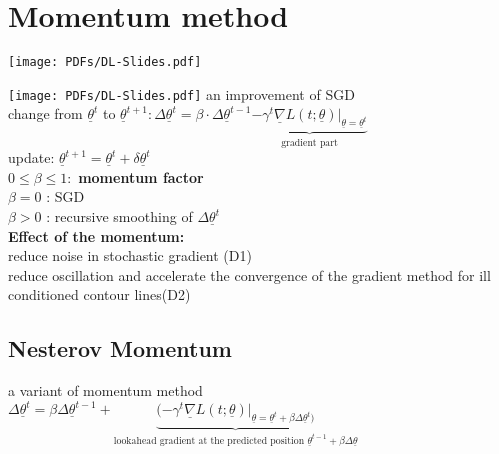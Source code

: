 \section{Momentum method}
\texttt{[image: PDFs/DL-Slides.pdf]}

\texttt{[image: PDFs/DL-Slides.pdf]}
an improvement of SGD \\
\textbullet change from $  \underline{\theta}^t $ to $ \underline{\theta} ^{t+1}: \Delta \underline{\theta}^t =\beta \cdot \Delta \underline{\theta}^{t-1}  \underbrace{  - \gamma^t \underline{\nabla}   L(t; \underline{\theta}) |_{\underline{\theta} = \underline{\theta}^t}}_{\text{gradient part}} $\\
\textbullet update: $  \underline{\theta}^{t+1} = \underline{\theta}^{t} + \delta \underline{\theta}^t $ \\
$  0 \leq \beta \leq 1 :  $ \textbf{momentum factor}\\
$  \beta =0 $ : SGD \\
$  \beta > 0  $ : recursive smoothing of $  \Delta \underline{\theta}^t $  \\
\textbf{Effect of the momentum: } \\
\textbullet reduce noise in stochastic gradient (D1) \\
\textbullet reduce oscillation and accelerate the convergence of the gradient method for ill conditioned contour lines(D2) 
\subsection{Nesterov Momentum}
a variant of momentum method \\
$  \Delta \underline{\theta} ^{t} =\beta \Delta \underline{\theta}^{t-1} +  \underbrace{(- \gamma^t \underline{ \nabla} L(t; \underline{\theta})|_{ \underline{\theta} = \underline{\theta}^t + \beta \Delta \underline{\theta}^t)}}_{\text{lookahead gradient at the predicted position } \underline{\theta}^{t-1} + \beta \Delta \underline{\theta}} $ 

